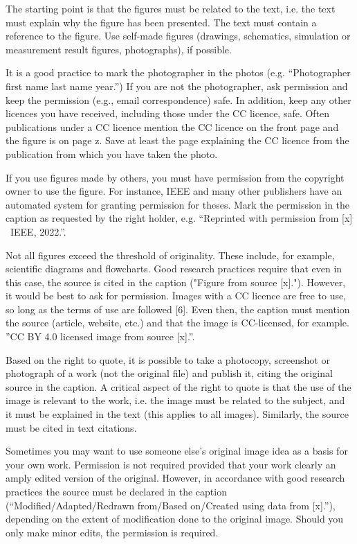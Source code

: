 The starting point is that the figures must be related to the text, i.e. the text must explain why the figure has been presented. The text must contain a reference to the figure. Use self-made figures (drawings, schematics, simulation or measurement result figures, photographs), if possible.

It is a good practice to mark the photographer in the photos (e.g. “Photographer first name last name year.”) If you are not the photographer, ask permission and keep the permission (e.g., email correspondence) safe. In addition, keep any other licences you have received, including those under the CC licence, safe. Often publications under a CC licence mention the CC licence on the front page and the figure is on page z. Save at least the page explaining the CC licence
from the publication from which you have taken the photo.

If you use figures made by others, you must have permission from the copyright owner to use the figure. For instance, IEEE and many other publishers have an automated system for granting permission for theses. Mark the permission in the caption as requested by the right holder, e.g. “Reprinted with permission from [x] \textcopyright\ IEEE, 2022.”.

Not all figures exceed the threshold of originality. These include, for example, scientific diagrams and flowcharts. Good research practices require that even in this case, the source is cited in the caption ("Figure from source [x]."). However, it would be best to ask for permission. Images with a CC licence are free to use, so long as the terms of use are followed [6]. Even then, the caption must mention the source (article, website, etc.) and that the image is CC-licensed, for example. ”CC BY 4.0 licensed image from source [x].”.

Based on the right to quote, it is possible to take a photocopy, screenshot or photograph of a work (not the original file) and publish it, citing the original source in the caption. A critical aspect of the right to quote is that the use of the image is relevant to the work, i.e. the image must be related to the subject, and it must be explained in the text (this applies to all images). Similarly, the source must be cited in text citations.

Sometimes you may want to use someone else's original image idea as a basis for your own work. Permission is not required provided that your work clearly an amply edited version of the original. However, in accordance with good research practices the source must be declared in the caption (“Modified/Adapted/Redrawn from/Based on/Created using data from [x].”), depending on the extent of modification done to the original image. Should you only make minor edits, the permission is required.

